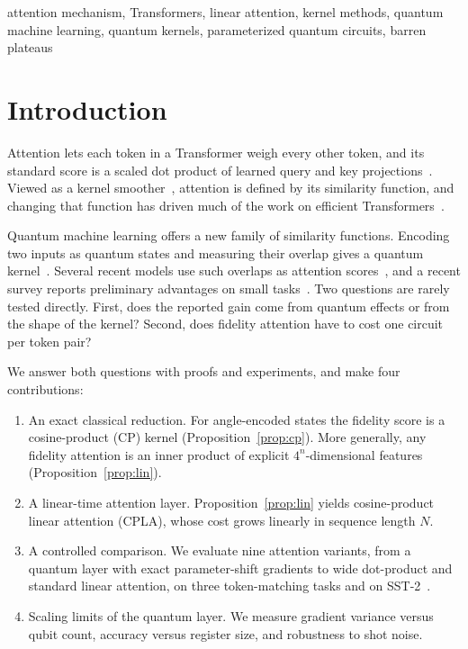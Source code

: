 \documentclass[conference]{IEEEtran}
\newcommand{\cpla}{CPLA}
\begin{document}
\begin{IEEEkeywords}
attention mechanism, Transformers, linear attention, kernel methods, quantum machine learning, quantum kernels, parameterized quantum circuits, barren plateaus
\end{IEEEkeywords}

\section{Introduction}

Attention lets each token in a Transformer weigh every other token, and its standard score is a scaled dot product of learned query and key projections~\cite{vaswani2017attention}. Viewed as a kernel smoother~\cite{tsai2019dissection}, attention is defined by its similarity function, and changing that function has driven much of the work on efficient Transformers~\cite{katharopoulos2020linear,choromanski2021performer,qin2022cosformer}.

Quantum machine learning offers a new family of similarity functions. Encoding two inputs as quantum states and measuring their overlap gives a quantum kernel~\cite{havlicek2019supervised,schuld2019feature}. Several recent models use such overlaps as attention scores~\cite{li2024qsann,zhao2024qksan,chen2024qmsan}, and a recent survey reports preliminary advantages on small tasks~\cite{zhang2025survey}. Two questions are rarely tested directly. First, does the reported gain come from quantum effects or from the shape of the kernel? Second, does fidelity attention have to cost one circuit per token pair?

We answer both questions with proofs and experiments, and make four contributions:
\begin{enumerate}
  \item An exact classical reduction. For angle-encoded states the fidelity score is a cosine-product (CP) kernel (Proposition~\ref{prop:cp}). More generally, any fidelity attention is an inner product of explicit $4^n$-dimensional features (Proposition~\ref{prop:lin}).
  \item A linear-time attention layer. Proposition~\ref{prop:lin} yields cosine-product linear attention (\cpla), whose cost grows linearly in sequence length $N$.
  \item A controlled comparison. We evaluate nine attention variants, from a quantum layer with exact parameter-shift gradients to wide dot-product and standard linear attention, on three token-matching tasks and on SST-2~\cite{socher2013sst}.
  \item Scaling limits of the quantum layer. We measure gradient variance versus qubit count, accuracy versus register size, and robustness to shot noise.
\end{enumerate}
\end{document}
